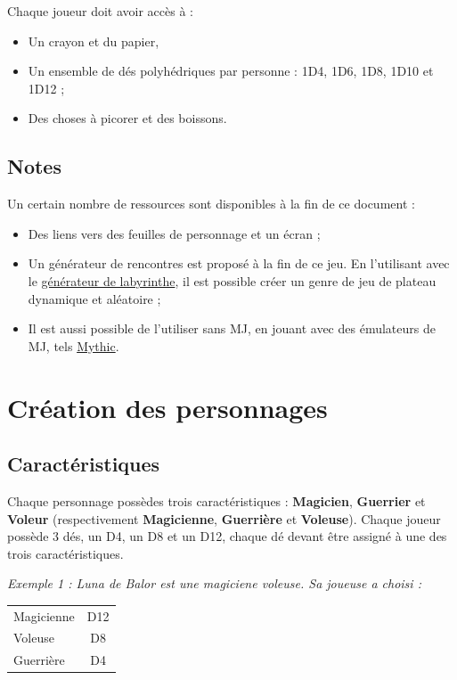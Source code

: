 \documentclass[a4paper, 11pt, twoside]{article}
\begin{document}
Chaque joueur doit avoir accès à :
\begin{itemize}
\item Un crayon et du papier,
\item Un ensemble de dés polyhédriques par personne : 1D4, 1D6, 1D8, 1D10 et 1D12 ;
\item Des choses à picorer et des boissons.
\end{itemize}

\subsection{Notes}
\label{sec:orge988505}

Un certain nombre de ressources sont disponibles à la fin de ce document :
\begin{itemize}
\item Des liens vers des feuilles de personnage et un écran ;
\item Un générateur de rencontres est proposé à la fin de ce jeu. En l'utilisant avec le \href{https://github.com/orey/jdr/tree/master/G\%25C3\%25A9n\%25C3\%25A9rateurLabyrinthe}{générateur de labyrinthe}, il est possible créer un genre de jeu de plateau dynamique et aléatoire ;
\item Il est aussi possible de l'utiliser sans MJ, en jouant avec des émulateurs de MJ, tels \href{https://github.com/orey/jdr/tree/master/Mythic-fr}{Mythic}.
\end{itemize}

\section{Création des personnages}
\label{sec:orgeebacd8}
\subsection{Caractéristiques}
\label{sec:org75f640e}

Chaque personnage possèdes trois caractéristiques : \textbf{Magicien}, \textbf{Guerrier} et \textbf{Voleur} (respectivement \textbf{Magicienne}, \textbf{Guerrière} et \textbf{Voleuse}). Chaque joueur possède 3 dés, un D4, un D8 et un D12, chaque dé devant être assigné à une des trois caractéristiques. 

\emph{Exemple 1 : Luna de Balor est une magiciene voleuse. Sa joueuse a choisi :}

\begin{longtable}{lc}
Magicienne & D12\\
Voleuse & D8\\
Guerrière & D4\\
\end{longtable}
\end{document}
